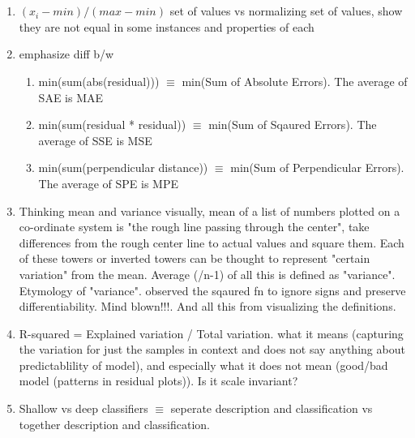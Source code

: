 \documentclass[../main.tex]{subfiles}
\begin{document}
\section{}
\begin{enumerate}[nolistsep]
  \item $(x_i - min) / (max - min)$ set of values vs normalizing set of values, show they are not equal in some instances and properties of each
  \item emphasize diff b/w
    \begin{enumerate}[nolistsep]
        \item min(sum(abs(residual))) $\equiv$ min(Sum of Absolute Errors). The average of SAE is MAE
        \item min(sum(residual * residual)) $\equiv$ min(Sum of Sqaured Errors). The average of SSE is MSE
        \item min(sum(perpendicular distance)) $\equiv$ min(Sum of Perpendicular Errors). The average of SPE is MPE
    \end{enumerate}
  \item Thinking mean and variance visually, mean of a list of numbers plotted on a co-ordinate system is "the rough line passing through the center", take differences from the rough center line to actual values and square them. Each of these towers or inverted towers can be thought to represent "certain variation" from the mean. Average (/n-1) of all this is defined as "variance". Etymology of "variance". observed the sqaured fn to ignore signs and preserve differentiability. Mind blown!!!. And all this from visualizing the definitions.
  \item R-squared = Explained variation / Total variation. what it means (capturing the variation for just the samples in context and does not say anything about predictablility of model), and especially what it does not mean (good/bad model (patterns in residual plots)). Is it scale invariant?
  \item Shallow vs deep classifiers $\equiv$ seperate description and classification vs together description and classification.
\end{enumerate}
\end{document}
